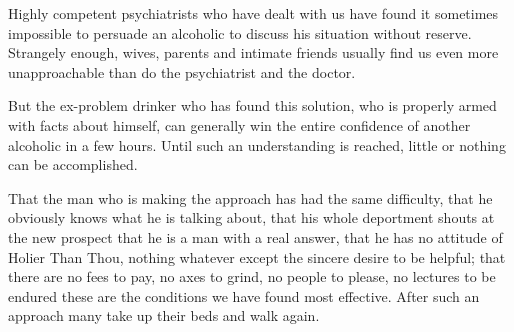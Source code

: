 \begin{biblechapter}

Highly competent psychiatrists who have dealt with us have found it sometimes impossible to persuade an alcoholic to discuss his situation without reserve. 
Strangely enough, wives, parents and intimate friends usually find us even more unapproachable than do the psychiatrist and the doctor.

But the ex-problem drinker who has found this solution, who is properly armed with facts about himself, 
can generally win the entire confidence of another alcoholic in a few hours. 
Until such an understanding is reached, little or nothing can be accomplished.

That the man who is making the approach has had the same difficulty, that he obviously knows what he is talking about, 
that his whole deportment shouts at the new prospect that he is a man with a real answer, 
that he has no attitude of Holier Than Thou, nothing whatever except the sincere desire to be helpful; 
that there are no fees to pay, no axes to grind, no people to please, no lectures to be endured 
these are the conditions we have found most effective. 
After such an approach many take up their beds and walk again.
\end{biblechapter}


